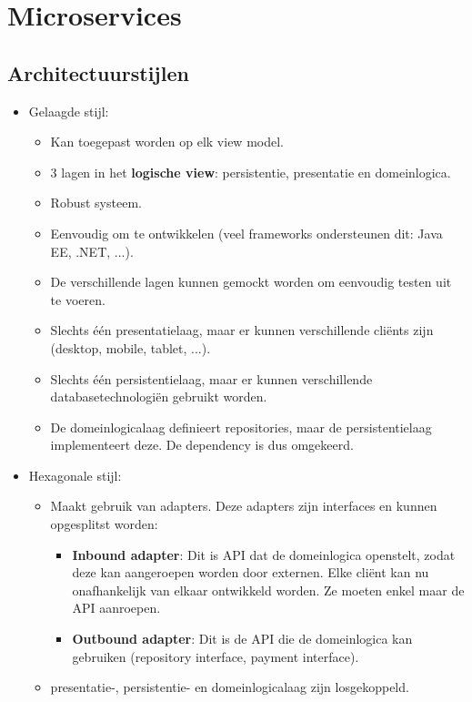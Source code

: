 \documentclass{report}
\begin{document}
	\part{Microservices}
	\chapter{Architectuurstijlen}
	\begin{itemize}
		\item[\info] Gelaagde stijl:
		\begin{itemize}
			\item[\info] Kan toegepast worden op elk view model.
			\item[\info] 3 lagen in het \textbf{logische view}: persistentie, presentatie en domeinlogica.
			\item[\good] Robust systeem.
			\item[\good] Eenvoudig om te ontwikkelen (veel frameworks ondersteunen dit: Java EE, .NET, ...).
			\item[\good] De verschillende lagen kunnen gemockt worden om eenvoudig testen uit te voeren.
			\item[\alert] Slechts één presentatielaag, maar er kunnen verschillende cliënts zijn (desktop, mobile, tablet, ...).
			\item[\alert] Slechts één persistentielaag, maar er kunnen verschillende databasetechnologiën gebruikt worden.
			\item[\alert] De domeinlogicalaag definieert repositories, maar de persistentielaag implementeert deze. De dependency is dus omgekeerd.
		\end{itemize}
		\item[\info] Hexagonale stijl:
		\begin{itemize}
			\item[\info] Maakt gebruik van adapters. Deze adapters zijn interfaces en kunnen opgesplitst worden:
			\begin{itemize}
				\item[\info] \textbf{Inbound adapter}: Dit is API dat de domeinlogica openstelt, zodat deze kan aangeroepen worden door externen. Elke cliënt kan nu onafhankelijk van elkaar ontwikkeld worden. Ze moeten enkel maar de API aanroepen.
				\item[\info] \textbf{Outbound adapter}: Dit is de API die de domeinlogica kan gebruiken (repository interface, payment interface).
			\end{itemize}
			\item[\good] presentatie-, persistentie- en domeinlogicalaag zijn losgekoppeld.

\end{itemize}
\end{itemize}
\end{document}
